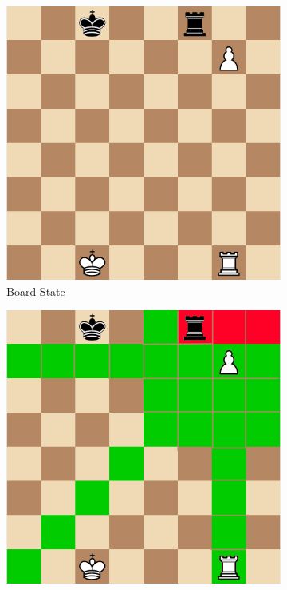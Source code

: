 \documentclass{article}
\begin{document}
  \begin{figure}[H]
    \begin{subfigure}[h]{0.48\linewidth}
      \includegraphics[width=\linewidth]{board}
      \caption{Board State}
    \end{subfigure}
    \hfill
    \begin{subfigure}[h]{0.48\linewidth}
      \includegraphics[width=\linewidth]{possible-moves}

\end{subfigure}
\end{figure}
\end{document}
